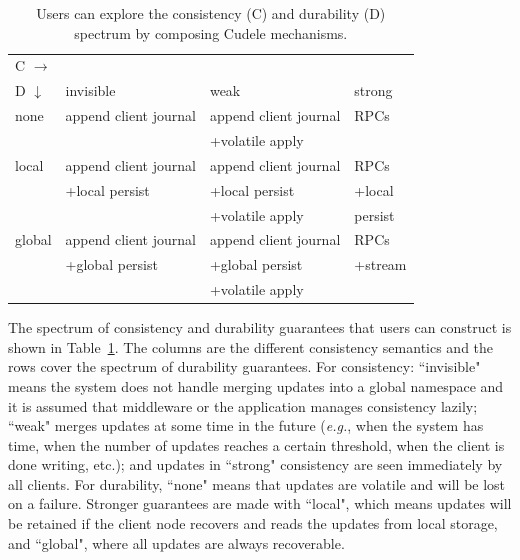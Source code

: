 \begin{table}[t]
\ssp
\begin{center}
\begin{tabular}{ l | l | l | l }
  C \(\rightarrow\) &&& \\  
  D \(\downarrow\)  	     & invisible         & weak        & strong  \\\hline
  none                       & append client journal            & append client journal          & RPCs    \\
                             &                   & +volatile apply &         \\\hdashline
  local                      & append client journal            & append client journal          & RPCs    \\
                             & +local persist    & +local persist  & +local  \\
                             &                   & +volatile apply &  persist\\\hdashline
  global                     & append client journal            & append client journal          & RPCs    \\
                             & +global persist   & +global persist & +stream \\
                             &                   & +volatile apply &         \\
\end{tabular}
\dsp
\caption{Users can explore the consistency (C) and
durability (D) spectrum by composing Cudele mechanisms. 
\label{table:spectrum}}
\end{center}
\end{table}

The spectrum of consistency and durability guarantees that users can construct
is shown in Table~\ref{table:spectrum}. The columns are the different
consistency semantics and the rows cover the spectrum of durability guarantees.
For consistency: ``invisible" means the system does not handle merging updates
into a global namespace and it is assumed that middleware or the application
manages consistency lazily; ``weak" merges updates at some time in the future
({\it e.g.}, when the system has time, when the number of updates reaches a
certain threshold, when the client is done writing, etc.); and updates in
``strong" consistency are seen immediately by all clients. For durability,
``none" means that updates are volatile and will be lost on a failure. Stronger
guarantees are made with ``local", which means updates will be retained if the
client node recovers and reads the updates from local storage, and ``global",
where all updates are always recoverable.

